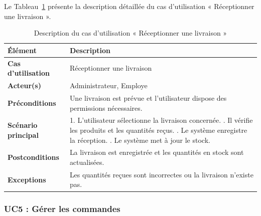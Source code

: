 Le Tableau~\ref{tab:uc4_sprint2} présente la description détaillée du cas d’utilisation « Réceptionner une livraison ».
\begin{longtable}{|>{\raggedright\arraybackslash}p{4cm}|>{\raggedright\arraybackslash}p{10.5cm}|}

\caption{Description du cas d’utilisation « Réceptionner une livraison »}
\label{tab:uc4_sprint2}\\

\hline
\textbf{Élément} & \textbf{Description} \\
\hline

\textbf{Cas d’utilisation} & Réceptionner une livraison \\
\hline

\textbf{Acteur(s)} & Administrateur, Employe \\
\hline

\textbf{Préconditions} &
Une livraison est prévue et l’utilisateur dispose des permissions nécessaires. \\
\hline

\textbf{Scénario principal} &

1. L’utilisateur sélectionne la livraison concernée. \newline
2. Il vérifie les produits et les quantités reçus. \newline
3. Le système enregistre la réception. \newline
4. Le système met à jour le stock. \\
   \hline

\textbf{Postconditions} &
La livraison est enregistrée et les quantités en stock sont actualisées. \\
\hline

\textbf{Exceptions} &
Les quantités reçues sont incorrectes ou la livraison n’existe pas. \\
\hline

\end{longtable}
\vspace{0.3cm}

\subsubsection{UC5 : Gérer les commandes}


